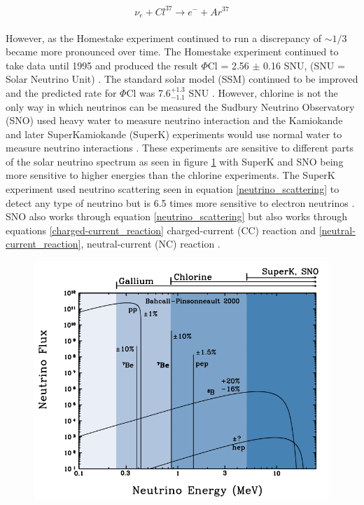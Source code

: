 \begin{equation}
    \nu_e + Cl^{37} \rightarrow  e^- + Ar^{37}
    \label{neutrino_chlorine_decay}
\end{equation}
\\However, as the Homestake experiment continued to run a discrepancy of $\sim 1/3$ became more pronounced over time. The Homestake experiment continued to take data until 1995 and produced the result $\Phi$Cl = 2.56 $\pm$ 0.16 SNU, (SNU = Solar Neutrino Unit) \cite{Bellerive:2003rj}. The standard solar model (SSM) continued to be improved and the predicted rate for $\Phi$Cl was 7.6$^{+ 1.3}_{-1.1}$ SNU \cite{Bellerive:2003rj}. However, chlorine is not the only way in which neutrinos can be measured the Sudbury Neutrino Observatory (SNO) used heavy water to measure neutrino interaction and the Kamiokande and later SuperKamiokande (SuperK) experiments would use normal water to measure neutrino interactions \cite{Bellerive:2003rj}. These experiments are sensitive to different parts of the solar neutrino spectrum as seen in figure \ref{neutrino_emmision_graph} with SuperK and SNO being more sensitive to higher energies than the chlorine experiments. The SuperK experiment used neutrino scattering seen in equation \ref{neutrino_scattering} to detect any type of neutrino but is 6.5 times more sensitive to electron neutrinos \cite{griffiths2008book} \cite{griffiths2008neutrinoOscillations}. SNO also works through equation \ref{neutrino_scattering} but also works through equations \ref{charged-current_reaction} charged-current (CC) reaction  and \ref{neutral-current_reaction}, neutral-current (NC) reaction \cite{sno2001}\cite{Bellerive:2003rj} \cite{griffiths2008book} \cite{griffiths2008neutrinoOscillations}. 
\begin{figure}[htbp]
 \centering
 \includegraphics[height=90mm]{Chapter1/Figs/Raster/neutrino_emmision_graph.png}
 \label{neutrino_emmision_graph}
\end{figure}
